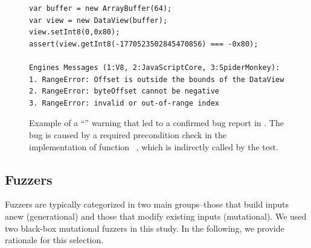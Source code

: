 \documentclass[sigconf,review, anonymous]{acmart}
\begin{document}
\begin{figure}[t!]
  \centering
  \begin{lstlisting}
var buffer = new ArrayBuffer(64);
var view = new DataView(buffer);
view.setInt8(0,0x80);
assert(view.getInt8(-1770523502845470856) === -0x80);

Engines Messages (1:V8, 2:JavaScriptCore, 3:SpiderMonkey):
1. RangeError: Offset is outside the bounds of the DataView
2. RangeError: byteOffset cannot be negative
3. RangeError: invalid or out-of-range index
  \end{lstlisting}
  \caption{\label{fig:lo-truepositive}Example of a ``\lo'' warning
    that led to a confirmed bug report in \chakra. The bug is caused
    by a required precondition check in the implementation of function
    ~\cite{ecmas262-getviewvalue}, which is indirectly called by the test. }
\end{figure}

\subsection{Fuzzers}
\label{sec:objects:fuzzers}

Fuzzers are typically categorized in two main groups--those that build
inputs anew (generational) and those that modify existing inputs
(mutational). We used two black-box mutational
fuzzers
in this study. In the following, we provide rationale for this
selection.
\end{document}
